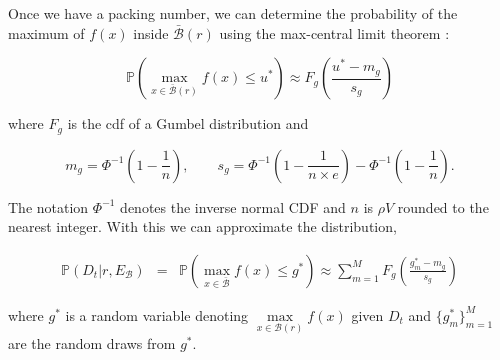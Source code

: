 \documentclass[preprint]{elsarticle}
\begin{document}
Once we have a packing number, we can determine the probability of the maximum of  $f(x)$ inside $\bar{\mathcal{B}}(r)$ using the max-central limit theorem \citep{fisher1928limiting}:
\begin{linenomath*}
\begin{equation}
\mathbb{P}(\underset{{x\in \bar{\mathcal{B}}(r)}}{\max}f(x) \leq u^*)\approx F_{g}\left(\frac{u^*-m_{g}}{s_{g}}\right)
\end{equation}
\end{linenomath*}
where $F_{g}$ is the cdf of a Gumbel distribution and 
\begin{linenomath*}
\begin{equation}
m_{g}=\Phi^{-1}\left(1-\frac{1}{n}\right),\qquad s_{g}=\Phi^{-1}\left(1-\frac{1}{n\times e}\right)-\Phi^{-1}\left(1-\frac{1}{n}\right).
\label{eqn:gumbel} 
\end{equation}
\end{linenomath*}
The notation $\Phi^{-1}$ denotes the inverse normal CDF and $n$ is ${\rho}{V}$ rounded to the nearest integer. With this we can approximate the distribution, 
\begin{linenomath*}
\begin{eqnarray}
\mathbb{P}(D_t|r,E_{\mathcal{B}})&=& \mathbb{P}(\underset{{x\in \bar{\mathcal{B}}}}{\max}f(x) \leq g^*)
\approx \sum_{m=1}^{M}F_{g}\left(\frac{{g_m^*}-m_{g}}{s_{g}}\right)\label{eqn:prob_Dt_given_Eb}
\end{eqnarray}
\end{linenomath*}
where $g^*$ is a random variable denoting $\underset{{x\in \mathcal{B}(r)}}{\max}f(x)$ given $D_t$ and $\{{g_m^*}\}_{m=1}^M$ are the random draws from $g^*$. 
\end{document}
